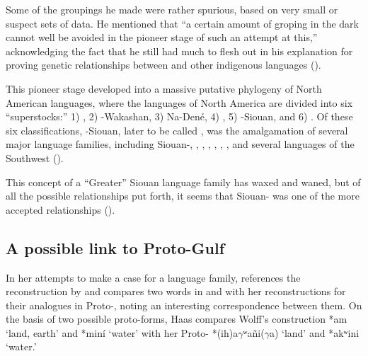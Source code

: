 \documentclass[output=paper]{LSP/langsci}
\begin{document}
Some of the groupings he made were rather spurious, based on very small or suspect sets of data. He mentioned that ``a certain amount of groping in the dark cannot well be avoided in the pioneer stage of such an attempt at this,'' acknowledging the fact that he still had much to flesh out in his explanation for proving genetic relationships between  and other indigenous languages (\citealt[289]{Sapir1920}). 

This pioneer stage developed into a massive putative phylogeny of North American languages, where the languages of North America are divided into six ``superstocks:'' 1) , 2) -Wakashan, 3) Na-Den\'e, 4) , 5) -Siouan, and 6) . Of these six classifications, -Siouan, later to be called , was the amalgamation of several major language families, including Siouan-, , , , , , , and several languages of the Southwest (\citealt{Sapir1929}). 

This concept of a ``Greater'' Siouan language family has waxed and waned, but of all the possible relationships put forth, it seems that Siouan- was one of the more accepted relationships (\citealt{CampbellMithun1979}).

\subsection{A possible link to Proto-Gulf}

In her attempts to make a case for a  language family, \citet{Haas1951,Haas1952} references the  reconstruction by \citep{Wolff1950a,Wolff1950b,Wolff1950c,Wolff1950d} and compares two words in  and  with her reconstructions for their analogues in Proto-, noting an interesting correspondence between them. On the basis of two possible proto-forms, Haas compares Wolff's  construction *am `land, earth' and *min\'i `water' with her Proto- *(ih)a$\gamma$ʷa\~ni($\gamma$a) `land' and *akʷini `water.' 
\end{document}
